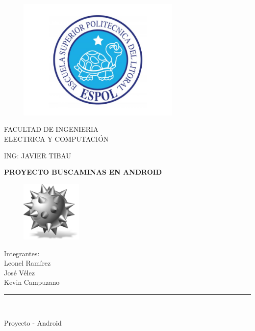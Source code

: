 \documentclass[12pt,oneside]{book}
\begin{document}
\begin{titlepage}

\begin{center}
\vspace*{-1in}
\begin{figure}[htb]
\begin{center}
\includegraphics[width=8cm]{./espol}
\end{center}
\end{figure}

FACULTAD DE INGENIERIA \\
\vspace*{0.15in}
ELECTRICA Y COMPUTACIÓN \\
\vspace*{0.6in}
\begin{large}
ING: JAVIER TIBAU\\
\end{large}
\vspace*{0.4in}
\begin{Large}
\textbf{PROYECTO BUSCAMINAS EN ANDROID} \newline \newline

\begin{figure}[htb]
\begin{center}
\includegraphics[width=3cm]{./icono}
\end{center}
\end{figure}

\end{Large}
\begin{large}
Integrantes:\\Leonel Ramírez\\José Vélez\\Kevin Campuzano\\ 
\end{large}
\vspace*{0.3in}
\rule{80mm}{0.1mm}\\
\vspace*{0.1in}
\begin{large}
Proyecto - Android
\end{large}
\end{center}

\end{titlepage}
\end{document}
